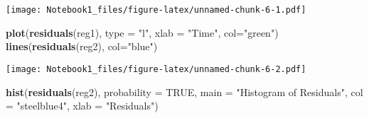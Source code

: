 \documentclass[]{article}
\newenvironment{Shaded}{\begin{snugshade}}{\end{snugshade}}
\newcommand{\DataTypeTok}[1]{\textcolor[rgb]{0.13,0.29,0.53}{#1}}
\newcommand{\DecValTok}[1]{\textcolor[rgb]{0.00,0.00,0.81}{#1}}
\newcommand{\KeywordTok}[1]{\textcolor[rgb]{0.13,0.29,0.53}{\textbf{#1}}}
\newcommand{\NormalTok}[1]{#1}
\newcommand{\OperatorTok}[1]{\textcolor[rgb]{0.81,0.36,0.00}{\textbf{#1}}}
\newcommand{\OtherTok}[1]{\textcolor[rgb]{0.56,0.35,0.01}{#1}}
\newcommand{\StringTok}[1]{\textcolor[rgb]{0.31,0.60,0.02}{#1}}
\begin{document}
\begin{Shaded}
\end{Shaded}

\texttt{[image: Notebook1\_files/figure-latex/unnamed-chunk-6-1.pdf]}

\begin{Shaded}
\begin{Highlighting}[]
\KeywordTok{plot}\NormalTok{(}\KeywordTok{residuals}\NormalTok{(reg1), }\DataTypeTok{type =} \StringTok{"l"}\NormalTok{, }\DataTypeTok{xlab =} \StringTok{"Time"}\NormalTok{, }\DataTypeTok{col=}\StringTok{"green"}\NormalTok{)}
\KeywordTok{lines}\NormalTok{(}\KeywordTok{residuals}\NormalTok{(reg2), }\DataTypeTok{col=}\StringTok{"blue"}\NormalTok{)}
\end{Highlighting}
\end{Shaded}

\texttt{[image: Notebook1\_files/figure-latex/unnamed-chunk-6-2.pdf]}

\begin{Shaded}
\begin{Highlighting}[]
\KeywordTok{hist}\NormalTok{(}\KeywordTok{residuals}\NormalTok{(reg2), }\DataTypeTok{probability =} \OtherTok{TRUE}\NormalTok{,  }
     \DataTypeTok{main =} \StringTok{"Histogram of Residuals"}\NormalTok{, }
     \DataTypeTok{col  =} \StringTok{"steelblue4"}\NormalTok{, }
     \DataTypeTok{xlab =} \StringTok{"Residuals"}\NormalTok{)}
\end{Highlighting}
\end{Shaded}
\end{document}
